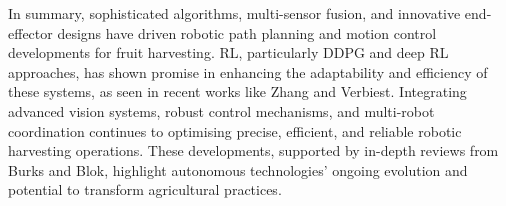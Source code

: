 \documentclass[a4paper,fleqn]{cas-dc}
\begin{document}
In summary, sophisticated algorithms, multi-sensor fusion, and innovative end-effector designs have driven robotic path planning and motion control developments for fruit harvesting. RL, particularly DDPG and deep RL approaches, has shown promise in enhancing the adaptability and efficiency of these systems, as seen in recent works like Zhang and Verbiest. Integrating advanced vision systems, robust control mechanisms, and multi-robot coordination continues to optimising precise, efficient, and reliable robotic harvesting operations. These developments, supported by in-depth reviews from Burks and Blok, highlight autonomous technologies' ongoing evolution and potential to transform agricultural practices.
\iffalse
\end{document}

